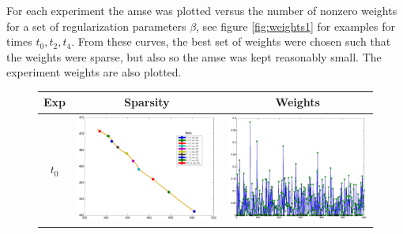 \documentclass[11pt]{article}
\begin{document}
For each experiment the {\sf amse} was plotted versus the number of nonzero weights for a set of regularization parameters $\beta$, see figure \ref{fig:weights1} for examples for times $t_0,t_2,t_4$. From these curves, the best set of weights were chosen such that the weights were sparse, but also so the {\sf amse} was kept reasonably small. The experiment weights are also plotted. 
\begin{figure}[!h]
	\renewcommand{\arraystretch}{1.5}
	\begin{center}
		\iwidth=80mm
		\begin{tabular}{|c|c|c|} %
			\hline		
			Exp & Sparsity & Weights	\\
			\hline	
			$t_0$
			&	
			\includegraphics[width=.8\iwidth]{figures/newFigs/exp1paretoWeights}
			&
			\includegraphics[width=.8\iwidth]{figures/newFigs/exp1Weights}\\

\end{tabular}
\end{center}
\end{figure}
\end{document}
